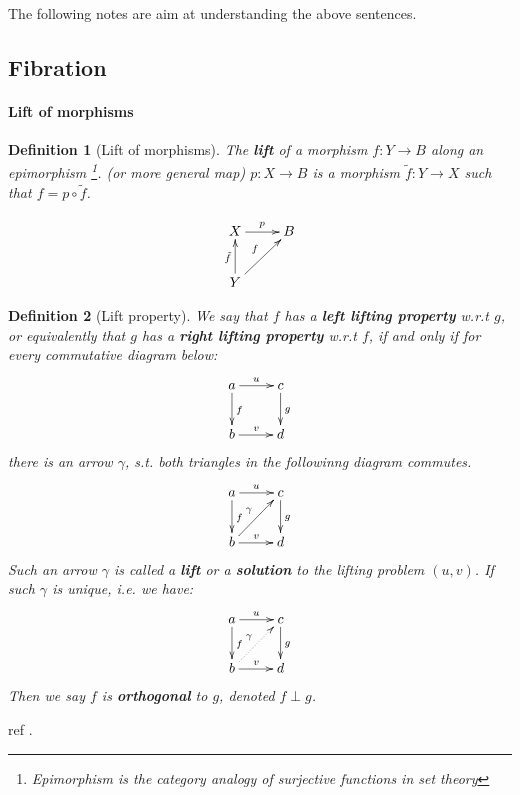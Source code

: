 \documentclass{article}
\numberwithin{equation}{subsection} %
\newtheorem{defi}{Definition}[section]
\theoremstyle{definition}
\begin{document}
    The following notes are aim at understanding the above sentences.

    \subsection{Fibration}
    \label{sec:Fibration}
    \paragraph{Lift of morphisms}
    \begin{defi}[Lift of morphisms]
        The \textbf{lift} of a morphism $f: Y\to B$ along an epimorphism
        \footnote{Epimorphism is the category analogy of surjective
        functions in set theory}. (or more general map) $p:X\to B$ is a
        morphism $\tilde{f}: Y\to X$ such that $f = p\circ\tilde{f}$.
    \end{defi}
    $$
    \xymatrix{
        X\ar[r]^p                    & B \\
        Y\ar[ur]^f\ar[u]^{\tilde{f}} & \\
    }
    $$
    \begin{defi}[Lift property]
        We say that $f$ has a \textbf{left lifting property} w.r.t $g$, or
        equivalently that $g$ has a \textbf{right lifting property} w.r.t
        $f$, if and only if for every commutative diagram below:
        $$
        \xymatrix{
        a\ar[r]^u\ar[d]^f & c\ar[d]^g \\
        b\ar[r]^v         & d
        }
        $$
        there is an arrow $\gamma$, s.t. both triangles in the followinng
        diagram commutes.
        $$ \xymatrix{
        a\ar[r]^u\ar[d]^f         & c\ar[d]^g \\
        b\ar[r]^v\ar[ru]^{\gamma} & d
        }$$
        Such an arrow $\gamma$ is called a \textbf{lift} or a 
        \textbf{solution} to the lifting problem $(u,v)$.
        If such $\gamma$ is unique, i.e. we have:
        $$ \xymatrix{
        a\ar[r]^u\ar[d]^f         & c\ar[d]^g \\
        b\ar[r]^v\ar@{.>}[ru]^{\gamma} & d
        }$$
        Then we say $f$ is \textbf{orthogonal} to $g$, denoted $f \perp g$.
    \end{defi}
    ref \cite{nlab-lift}.
   
\end{document}
